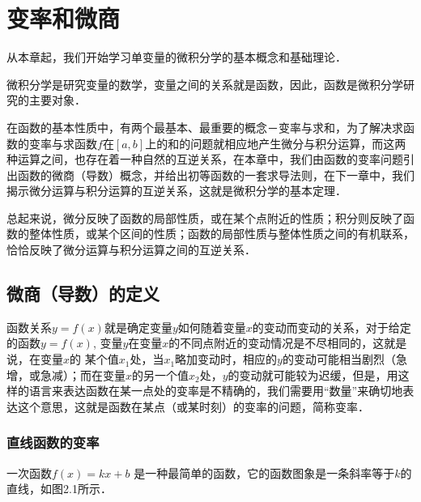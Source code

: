 
\chapter{变率和微商}

从本章起，我们开始学习单变量的微积分学的基本概念和基础理论．

微积分学是研究变量的数学，变量之间的关系就是函数，因此，函数是微积分学研究的主要对象．

在函数的基本性质中，有两个最基本、最重要的概念－变率与求和，为了解决求函数的变率与求函数$f$在$[a,b]$上的和的问题就相应地产生微分与积分运算，而这两种运算之间，也存在着一种自然的互逆关系，在本章中，我们由函数的变率问题引出函数的微商（导数）概念，并给出初等函数的一套求导法则，在下一章中，我们揭示微分运算与积分运算的互逆关系，这就是微积分学的基本定理．

总起来说，微分反映了函数的局部性质，或在某个点附近的性质；积分则反映了函数的整体性质，或某个区间的性质；函数的局部性质与整体性质之间的有机联系，恰恰反映了微分运算与积分运算之间的互逆关系．

\section{微商（导数）的定义}
函数关系$y=f(x)$就是确定变量$y$如何随着变量$x$的变动而变动的关系，对于给定的函数$y=f(x)$, 变量$y$在变量$x$的不同点附近的变动情况是不尽相同的，这就是说，在变量$x$的
某个值$x_1$处，当$x_1$略加变动时，相应的$y$的变动可能相当剧烈（急增，或急减）；而在变量$x$的另一个值$x_2$处，$y$的变动就可能较为迟缓，但是，用这样的语言来表达函数在某一点处的变率是不精确的，我们需要用“数量”来确切地表达这个意思，这就是函数在某点（或某时刻）的变率的问题，简称变率．

\subsection{直线函数的变率}
一次函数$f (x) =kx+b$
是一种最简单的函数，它的函数图象是一条斜率等于$k$的直线，如图2.1所示．
\begin{figure}[htp]
    \centering
{}
    \caption{}
\end{figure}

